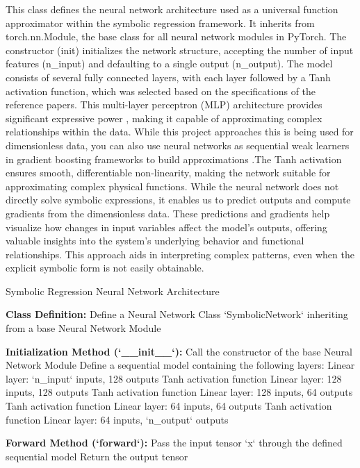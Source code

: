 \documentclass{article}
\begin{document}
This class defines the neural network architecture used as a universal function approximator within the symbolic regression framework. It inherits from torch.nn.Module, the base class for all neural network modules in PyTorch. The constructor (init) initializes the network structure, accepting the number of input features (n\_input) and defaulting to a single output (n\_output). The model consists of several fully connected layers, with each layer followed by a Tanh activation function, which was selected based on the specifications of the reference papers. This multi-layer perceptron (MLP) architecture provides significant expressive power \cite{abdellaoui2021}, making it capable of approximating complex relationships within the data. While this project approaches this is being used for dimensionless data, you can also use neural networks as sequential weak learners in gradient boosting frameworks to build approximations \cite{badirli2020}.The Tanh activation ensures smooth, differentiable non-linearity, making the network suitable for approximating complex physical functions. While the neural network does not directly solve symbolic expressions, it enables us to predict outputs and compute gradients from the dimensionless data. These predictions and gradients help visualize how changes in input variables affect the model's outputs, offering valuable insights into the system's underlying behavior and functional relationships. This approach aids in interpreting complex patterns, even when the explicit symbolic form is not easily obtainable.\\




\begin{algorithm}[H]
\SetAlgoLined
\caption{Symbolic Regression Neural Network Architecture}
\label{alg:symbolic_network} %

\textbf{Class Definition:}\;
Define a Neural Network Class `SymbolicNetwork` inheriting from a base Neural Network Module\;

\textbf{Initialization Method (`__init__`):}\;
\;
Call the constructor of the base Neural Network Module\;
Define a sequential model containing the following layers:\;
\Indp %
Linear layer: `n_input` inputs, 128 outputs\;
Tanh activation function\;
Linear layer: 128 inputs, 128 outputs\;
Tanh activation function\;
Linear layer: 128 inputs, 64 outputs\;
Tanh activation function\;
Linear layer: 64 inputs, 64 outputs\;
Tanh activation function\;
Linear layer: 64 inputs, `n_output` outputs\;
\Indm %

\textbf{Forward Method (`forward`):}\;
\;
\;
Pass the input tensor `x` through the defined sequential model\;
Return the output tensor\;

\end{algorithm}\\
\end{document}
